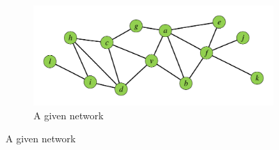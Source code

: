 \begin{figure}[t]
        \captionsetup[subfigure]{aboveskip=-2pt, belowskip=-1pt}
        \centering
        \begin{subfigure}[b]{0.65\textwidth}
                \includegraphics[width=\textwidth]{./images/figs-original.pdf}
                \caption{A given network}
                \label{fig:1-a}
        \end{subfigure}
        

\end{figure}
